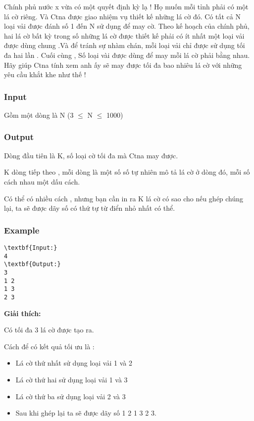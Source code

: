 

Chính phủ nước x vừa có một quyết định kỳ lạ ! Họ muốn mỗi tỉnh phải có một lá cờ riêng. Và Ctna được giao nhiệm vụ thiết kế những lá cờ đó. Có tất cả N loại vải được đánh số 1 đến N sử dụng để may cờ. Theo kế hoạch của chính phủ, hai lá cờ bất kỳ trong số những lá cờ được thiết kế phải có ít nhất một loại vải được dùng chung .Và để tránh sự nhàm chán, mỗi loại vải chỉ được sử dụng tối đa hai lần . Cuối cùng , Số loại vài được dùng để may mỗi lá cờ phải bằng nhau. Hãy giúp Ctna tính xem anh ấy sẽ may được tối đa bao nhiêu lá cờ với những yêu cầu khắt khe như thế !

\subsubsection{Input}

Gồm một dòng là N (3  $\le$  N  $\le$  1000)

\subsubsection{Output}

Dòng đầu tiên là K, số loại cờ tối đa mà Ctna may được.

K dòng tiếp theo , mỗi dòng là một số số tự nhiên mô tả lá cờ ở dòng đó, mỗi số cách nhau một dấu cách.

Có thể có nhiều cách , nhưng bạn cần in ra K lá cờ có sao cho nếu ghép chúng lại, ta sẽ được dãy số có thứ tự từ điển nhỏ nhất có thể.

\subsubsection{Example}
\begin{verbatim}
\textbf{Input:}
4
\textbf{Output:}
3
1 2
1 3
2 3\end{verbatim}




\textbf{Giải thích:}

Có tối đa 3 lá cờ được tạo ra.


Cách để có kết quả tối ưu là :
\begin{itemize}
	\item Lá cờ thứ nhất sử dụng loại vải 1 và 2
	\item Lá cờ thứ hai sử dụng loại vải 1 và 3
	\item Lá cờ thứ ba sử dụng loại vải 2 và 3
	\item Sau khi ghép lại ta sẽ được dãy số 1 2 1 3 2 3.
\end{itemize}

